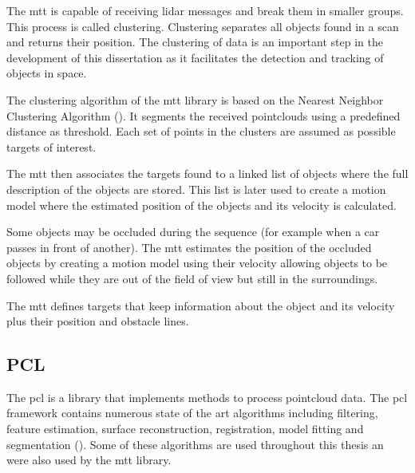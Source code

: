 The \gls{mtt} is capable of receiving \gls{lidar} messages and break them in smaller groups. This process is called clustering. Clustering separates all objects found in a scan and returns their position. The clustering of data is an important step in the development of this dissertation as it facilitates the detection and tracking of objects in space. 

The clustering algorithm of the \gls{mtt} library is based on the Nearest Neighbor Clustering Algorithm (\cite{Luo}). It segments the received pointclouds using a predefined distance as threshold. Each set of points in the clusters are assumed as possible targets of interest.

The \gls{mtt} then associates the targets found to a linked list of objects where the full description of the objects are stored. This list is later used to create a motion model where the estimated position of the objects and its velocity is calculated. 

Some objects may be occluded during the sequence (for example when a car passes in front of another). The \gls{mtt} estimates the position of the occluded objects by creating a motion model using their velocity allowing objects to be followed while they are out of the field of view but still in the surroundings.

The \gls{mtt} defines targets that keep information about the object and its velocity plus their position and obstacle lines.

\subsection{PCL}

The \gls{pcl} is a library that implements methods to process pointcloud data. The \gls{pcl} framework contains numerous state of the art algorithms including filtering, feature estimation, surface reconstruction, registration, model fitting and segmentation (\cite{PointCloudLibrary2018}). Some of these algorithms are used throughout this thesis an were also used by the \gls{mtt} library.



 








